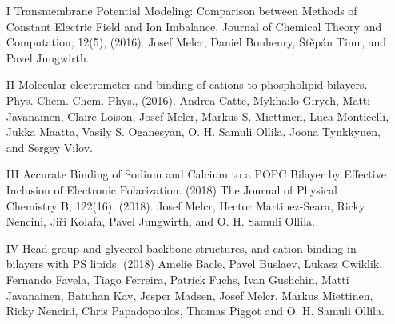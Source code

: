 \documentclass[12pt,a4paper,twoside,openright]{report}
\let\openright=\cleardoublepage
\begin{document}

\begin{itemize}
\item[I] 
Transmembrane Potential Modeling: Comparison between Methods of Constant Electric
Field and Ion Imbalance. 
Journal of Chemical Theory and Computation, 12(5), (2016). 
Josef Melcr, Daniel Bonhenry, Štěpán Timr, and Pavel Jungwirth. 

\item[II] 
Molecular electrometer and binding of cations to phospholipid bilayers. 
Phys. Chem. Chem. Phys., (2016).
Andrea Catte, Mykhailo Girych, Matti Javanainen, Claire Loison, Josef Melcr,
Markus S. Miettinen, Luca Monticelli, Jukka Maatta, Vasily S. Oganesyan,
O. H. Samuli Ollila, Joona Tynkkynen, and Sergey Vilov. 

\item[III]
Accurate Binding of Sodium and Calcium to a POPC Bilayer by Effective Inclusion of Electronic Polarization. (2018)
The Journal of Physical Chemistry B, 122(16), (2018).
Josef Melcr, Hector Martinez-Seara, Ricky Nencini, Jiří Kolafa, Pavel Jungwirth,
and O. H. Samuli Ollila. 

\item[IV]
Head group and glycerol backbone structures,
and cation binding in bilayers with PS lipids. (2018)
Amelie Bacle, Pavel Buslaev, Lukasz Cwiklik, Fernando Favela, Tiago Ferreira,
Patrick Fuchs, Ivan Gushchin, Matti Javanainen, Batuhan Kav, Jesper Madsen, 
Josef Melcr, Markus Miettinen, Ricky Nencini,  Chris Papadopoulos, Thomas Piggot 
and O. H. Samuli Ollila. 

\end{itemize}

\appendix

\openright
\end{document}
